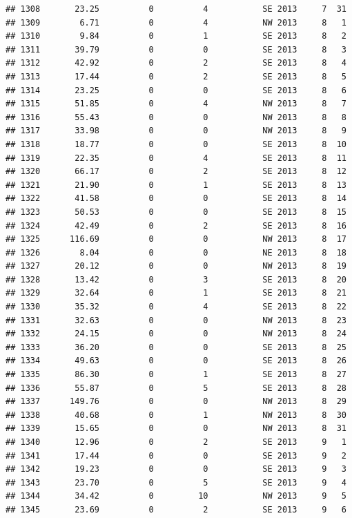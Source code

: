\documentclass[
]{article}
\begin{document}
\begin{verbatim}
## 1308       23.25          0          4           SE 2013     7  31
## 1309        6.71          0          4           NW 2013     8   1
## 1310        9.84          0          1           SE 2013     8   2
## 1311       39.79          0          0           SE 2013     8   3
## 1312       42.92          0          2           SE 2013     8   4
## 1313       17.44          0          2           SE 2013     8   5
## 1314       23.25          0          0           SE 2013     8   6
## 1315       51.85          0          4           NW 2013     8   7
## 1316       55.43          0          0           NW 2013     8   8
## 1317       33.98          0          0           NW 2013     8   9
## 1318       18.77          0          0           SE 2013     8  10
## 1319       22.35          0          4           SE 2013     8  11
## 1320       66.17          0          2           SE 2013     8  12
## 1321       21.90          0          1           SE 2013     8  13
## 1322       41.58          0          0           SE 2013     8  14
## 1323       50.53          0          0           SE 2013     8  15
## 1324       42.49          0          2           SE 2013     8  16
## 1325      116.69          0          0           NW 2013     8  17
## 1326        8.04          0          0           NE 2013     8  18
## 1327       20.12          0          0           NW 2013     8  19
## 1328       13.42          0          3           SE 2013     8  20
## 1329       32.64          0          1           SE 2013     8  21
## 1330       35.32          0          4           SE 2013     8  22
## 1331       32.63          0          0           NW 2013     8  23
## 1332       24.15          0          0           NW 2013     8  24
## 1333       36.20          0          0           SE 2013     8  25
## 1334       49.63          0          0           SE 2013     8  26
## 1335       86.30          0          1           SE 2013     8  27
## 1336       55.87          0          5           SE 2013     8  28
## 1337      149.76          0          0           NW 2013     8  29
## 1338       40.68          0          1           NW 2013     8  30
## 1339       15.65          0          0           NW 2013     8  31
## 1340       12.96          0          2           SE 2013     9   1
## 1341       17.44          0          0           SE 2013     9   2
## 1342       19.23          0          0           SE 2013     9   3
## 1343       23.70          0          5           SE 2013     9   4
## 1344       34.42          0         10           NW 2013     9   5
## 1345       23.69          0          2           SE 2013     9   6

\end{verbatim}
\end{document}
